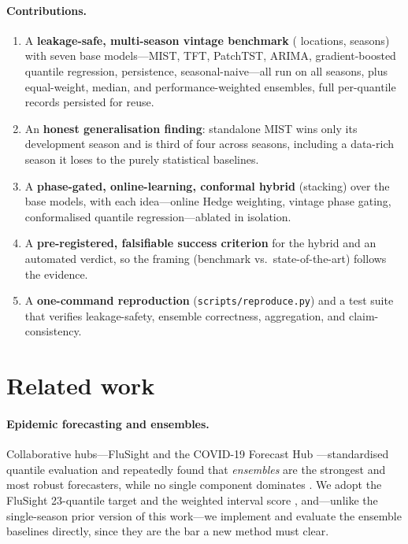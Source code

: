 \documentclass{article}
\begin{document}
\paragraph{Contributions.}
\begin{enumerate}
  \item A \textbf{leakage-safe, multi-season vintage benchmark} (\nLoc{} locations, \nSeasons{}
        seasons) with seven base models---MIST, TFT, PatchTST, ARIMA, gradient-boosted quantile
        regression, persistence, seasonal-naive---all run on all seasons, plus equal-weight,
        median, and performance-weighted ensembles, full per-quantile records persisted for reuse.
  \item An \textbf{honest generalisation finding}: standalone MIST wins only its development
        season and is third of four across seasons, including a data-rich season it loses to the
        purely statistical baselines.
  \item A \textbf{phase-gated, online-learning, conformal hybrid} (stacking) over the base models,
        with each idea---online Hedge weighting, vintage phase gating, conformalised quantile
        regression---ablated in isolation.
  \item A \textbf{pre-registered, falsifiable success criterion} for the hybrid and an automated
        verdict, so the framing (benchmark vs.\ state-of-the-art) follows the evidence.
  \item A \textbf{one-command reproduction} (\texttt{scripts/reproduce.py}) and a test suite that
        verifies leakage-safety, ensemble correctness, aggregation, and claim-consistency.
\end{enumerate}

\section{Related work}

\paragraph{Epidemic forecasting and ensembles.} Collaborative hubs---FluSight and the COVID-19
Forecast Hub \cite{cramer2022covidhub}---standardised quantile evaluation and repeatedly found
that \emph{ensembles} are the strongest and most robust forecasters, while no single component
dominates \cite{reich2019collaborative}. We adopt the FluSight 23-quantile target and the weighted
interval score \cite{bracher2021wis}, and---unlike the single-season prior version of this work---we
implement and evaluate the ensemble baselines directly, since they are the bar a new method must
clear.
\end{document}
